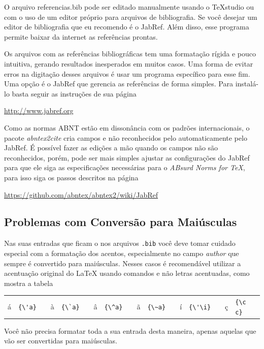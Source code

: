 \begin{apendicesenv}
    O arquivo {\color{red} referencias.bib} pode ser editado manualmente usando o
    TeXstudio ou com o uso de um editor próprio para arquivos de bibliografia.
    Se você desejar um editor de bibliografia que eu recomendo é o JabRef.
    Além disso, esse programa permite baixar da internet as referências prontas.

    Os arquivos com as referências bibliográficas tem uma formatação rígida e pouco intuitiva, gerando resultados inesperados em muitos casos. Uma forma de evitar erros na digitação desses arquivos é usar um programa específico para esse fim. Uma opção é o JabRef que gerencia as referências de forma simples. Para instalá-lo basta seguir as instruções de sua página
    \begin{center}
        \url{http://www.jabref.org}
    \end{center}

    Como as normas ABNT estão em dissonância com os padrões internacionais,
    o pacote \textit{abntex2cite} cria campos e não reconhecidos pelo automaticamente
    pelo JabRef.
    É possível fazer as edições a mão quando os campos não são reconhecidos,
    porém, pode ser mais simples ajustar as configurações do JabRef para que
    ele siga as especificações necessárias para o \textit{ABsurd Norms for TeX},
    para isso siga os passos descritos na página
    \begin{center}
        \url{https://github.com/abntex/abntex2/wiki/JabRef}
    \end{center}

    \subsection{Problemas com Conversão para Maiúsculas}

    Nas suas entradas que ficam o nos arquivos \texttt{.bib}
    você deve tomar cuidado especial com a formatação dos acentos,
    especialmente no campo \textit{author} que sempre é convertido para maiúsculas.
    Nesses casos é recomendável utilizar a acentuação original do \LaTeX
    usando comandos e não letras acentuadas, como mostra a tabela
    \begin{center}
        \begin{tabular}{clcclcclcclcclccl}
            á & \verb!{\'a}! &  &
            à & \verb!{\`a}! &  &
            â & \verb!{\^a}! &  &
            ã & \verb!{\~a}! &  &
            í & \verb!{\'\i}! &  &
            ç & \verb!{\c c}!
        \end{tabular}
    \end{center}
    Você não precisa formatar toda a sua entrada desta maneira,
    apenas aquelas que vão ser convertidas para maiúsculas.


\end{apendicesenv}
